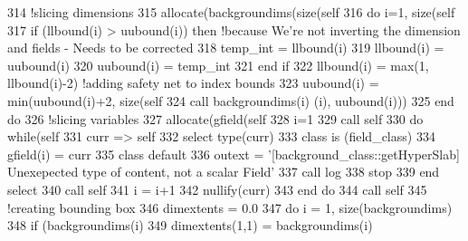 \begin{DoxyCode}
314     \textcolor{comment}{!slicing dimensions}
315     \textcolor{keyword}{allocate}(backgroundims(\textcolor{keyword}{size}(self%
316     \textcolor{keywordflow}{do} i=1, \textcolor{keyword}{size}(self%
317         \textcolor{keywordflow}{if} (llbound(i) > uubound(i)) \textcolor{keywordflow}{then} \textcolor{comment}{!because We're not inverting the dimension and fields - Needs to
       be corrected}
318             temp\_int = llbound(i)
319             llbound(i) = uubound(i)
320             uubound(i) = temp\_int
321 \textcolor{keywordflow}{        end if}
322         llbound(i) = max(1, llbound(i)-2) \textcolor{comment}{!adding safety net to index bounds}
323         uubound(i) = min(uubound(i)+2, \textcolor{keyword}{size}(self%
324         \textcolor{keyword}{call }backgroundims(i)%
      (i), uubound(i)))
325 \textcolor{keywordflow}{    end do}
326     \textcolor{comment}{!slicing variables}
327     \textcolor{keyword}{allocate}(gfield(self%
328     i=1
329     \textcolor{keyword}{call }self%
330     \textcolor{keywordflow}{do} \textcolor{keywordflow}{while}(self%
331         curr => self%
332         \textcolor{keywordflow}{select type}(curr)
333 \textcolor{keywordflow}{        class is} (field\_class)
334             gfield(i) = curr%
335 \textcolor{keywordflow}{            class default}
336             outext = \textcolor{stringliteral}{'[background\_class::getHyperSlab] Unexepected type of content, not a scalar Field'}
337             \textcolor{keyword}{call }log%
338             stop
339 \textcolor{keywordflow}{        end select}
340         \textcolor{keyword}{call }self%
341         i = i+1
342         \textcolor{keyword}{nullify}(curr)
343 \textcolor{keywordflow}{    end do}
344     \textcolor{keyword}{call }self%
345     \textcolor{comment}{!creating bounding box}
346     dimextents = 0.0
347     \textcolor{keywordflow}{do} i = 1, \textcolor{keyword}{size}(backgroundims)
348         \textcolor{keywordflow}{if} (backgroundims(i)%
349             dimextents(1,1) = backgroundims(i)%

\end{DoxyCode}
